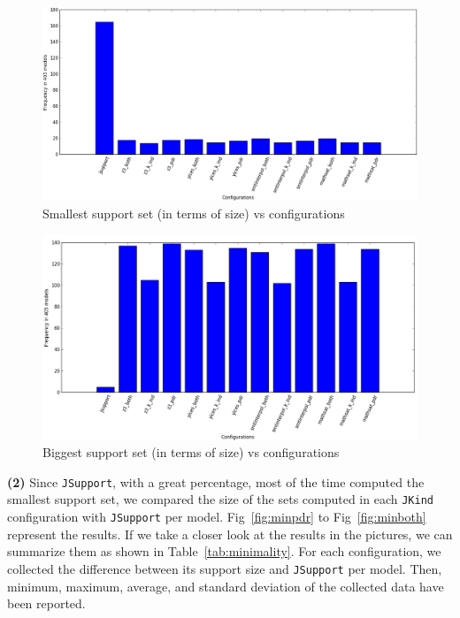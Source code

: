 \begin{figure}
  \centering
  \includegraphics[width=\textwidth]{figs/small_conf.png}
  \caption{\small{Smallest support set (in terms of size) vs configurations}}\label{fig:smallest}
\end{figure}


\begin{figure}
  \centering
  \includegraphics[width=\textwidth]{figs/big_conf.png}
  \caption{\small{Biggest support set (in terms of size) vs configurations}}\label{fig:bigest}
\end{figure}

\vspace{6pt}
\noindent{}
 \vspace{9pt}

\textbf{(2)} Since \texttt{JSupport}, with a great percentage, most of the time computed the smallest support set, we compared the size of the sets computed in each \texttt{JKind} configuration with \texttt{JSupport} per model. Fig~\ref{fig:minpdr} to Fig~\ref{fig:minboth} represent the results. If we take a closer look at the results in the pictures, we can summarize them as shown in Table~\ref{tab:minimality}. For each configuration, we collected the difference between its support size and \texttt{JSupport} per model. Then, minimum, maximum, average, and standard deviation of the collected data have been reported.


